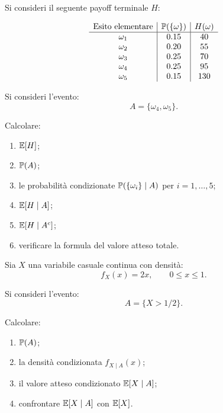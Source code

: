 \begin{exercise}
\label{ex:cap3-prop-payoff-evento}

Si consideri il seguente payoff terminale $H$:

\[
\begin{array}{c|c|c}
\text{Esito elementare} & \mathbb{P}(\{\omega\}) & H(\omega) \\
\hline
\omega_1 & 0.15 & 40 \\
\omega_2 & 0.20 & 55 \\
\omega_3 & 0.25 & 70 \\
\omega_4 & 0.25 & 95 \\
\omega_5 & 0.15 & 130 \\
\end{array}
\]

Si consideri l'evento:
\[
A=\{\omega_4,\omega_5\}.
\]

Calcolare:

\begin{enumerate}
    \item $\mathbb{E}[H]$;

    \item $\mathbb{P}(A)$;

    \item le probabilit\`{a} condizionate
    $\mathbb{P}(\{\omega_i\}\mid A)$ per $i=1,\ldots,5$;

    \item $\mathbb{E}[H\mid A]$;

    \item $\mathbb{E}[H\mid A^c]$;

    \item verificare la formula del valore atteso totale.
\end{enumerate}

\end{exercise}

\begin{exercise}
\label{ex:cap3-prop-condizionato-continuo}

Sia $X$ una variabile casuale continua con densit\`{a}:
\[
f_X(x)
=
2x,
\qquad
0\leq x\leq 1.
\]

Si consideri l'evento:
\[
A=\{X>1/2\}.
\]

Calcolare:

\begin{enumerate}
    \item $\mathbb{P}(A)$;

    \item la densit\`{a} condizionata $f_{X\mid A}(x)$;

    \item il valore atteso condizionato $\mathbb{E}[X\mid A]$;

    \item confrontare $\mathbb{E}[X\mid A]$ con $\mathbb{E}[X]$.
\end{enumerate}

\end{exercise}

